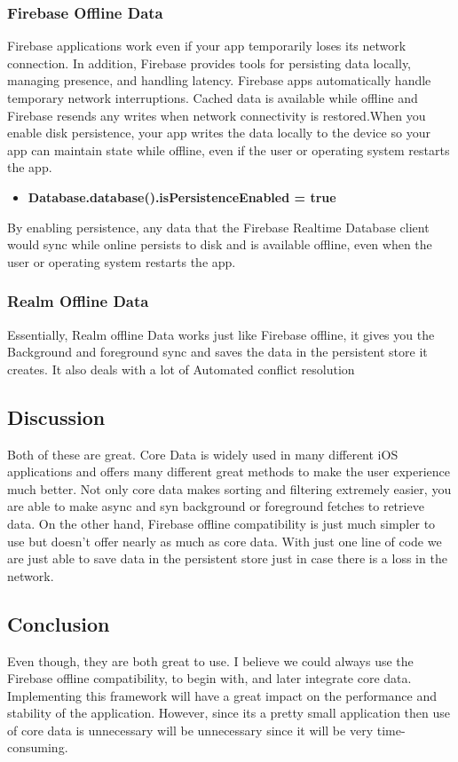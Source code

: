 \documentclass[onecolumn, draftclsnofoot,10pt, compsoc]{IEEEtran}
\begin{document}
\subsubsection{Firebase Offline Data\cite{Firebase}}
\par Firebase applications work even if your app temporarily loses its network connection. In addition, Firebase provides tools for persisting data locally, managing presence, and handling latency. Firebase apps automatically handle temporary network interruptions. Cached data is available while offline and Firebase resends any writes when network connectivity is restored.When you enable disk persistence, your app writes the data locally to the device so your app can maintain state while offline, even if the user or operating system restarts the app.
\begin{itemize}
\item \textbf{Database.database().isPersistenceEnabled = true}
\end{itemize}
By enabling persistence, any data that the Firebase Realtime Database client would sync while online persists to disk and is available offline, even when the user or operating system restarts the app.

\subsubsection{Realm Offline Data\cite{Realm}}
Essentially, Realm offline Data works just like Firebase offline, it gives you the Background and foreground sync and saves the data in the persistent store it creates. It also deals with a lot of Automated conflict resolution

\subsection{Discussion}
Both of these are great. Core Data is widely used in many different iOS applications and offers many different great methods to make the user experience much better. Not only core data makes sorting and filtering extremely easier, you are able to make async and syn background or foreground fetches to retrieve data. On the other hand, Firebase offline compatibility is just much simpler to use but doesn't offer nearly as much as core data. With just one line of code we are just able to save data in the persistent store just in case there is a loss in the network.

\subsection{Conclusion}
Even though, they are both great to use. I believe we could always use the Firebase offline compatibility, to begin with, and later integrate core data. Implementing this framework will have a great impact on the performance and stability of the application. However, since its a pretty small application then use of core data is unnecessary will be unnecessary since it will be very time-consuming.
\end{document}
